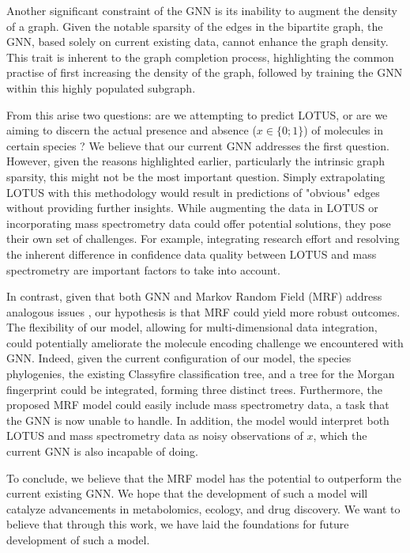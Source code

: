 \documentclass[
11pt, %
oneside, %
english, %
singlespacing, %
headsepline, %
chapterinoneline, %
]{MastersDoctoralThesis} %
\begin{document}
Another significant constraint of the GNN is its inability to augment the density of a graph. Given the notable sparsity of the edges in the bipartite graph, the GNN, based solely on current existing data, cannot enhance the graph density. This trait is inherent to the graph completion process, highlighting the common practise of first increasing the density of the graph, followed by training the GNN within this highly populated subgraph.

From this arise two questions: are we attempting to predict LOTUS, or are we aiming to discern the actual presence and absence ($x \in \{0;1\}$) of molecules in certain species ? We believe that our current GNN addresses the first question. However, given the reasons highlighted earlier, particularly the intrinsic graph sparsity, this might not be the most important question. Simply extrapolating LOTUS with this methodology would result in predictions of "obvious" edges without providing further insights. While augmenting the data in LOTUS or incorporating mass spectrometry data could offer potential solutions, they pose their own set of challenges. For example, integrating research effort and resolving the inherent difference in confidence data quality between LOTUS and mass spectrometry are important factors to take into account.

In contrast, given that both GNN and Markov Random Field (MRF) address analogous issues \cite{jiaGraphBeliefPropagation2021}, our hypothesis is that MRF could yield more robust outcomes. The flexibility of our model, allowing for multi-dimensional data integration, could potentially ameliorate the molecule encoding challenge we encountered with GNN. Indeed, given the current configuration of our model, the species phylogenies, the existing Classyfire classification tree, and a tree for the Morgan fingerprint could be integrated, forming three distinct trees. Furthermore, the proposed MRF model could easily include mass spectrometry data, a task that the GNN is now unable to handle. In addition, the model would interpret both LOTUS and mass spectrometry data as noisy observations of $x$, which the current GNN is also incapable of doing.

To conclude, we believe that the MRF model has the potential to outperform the current existing GNN. We hope that the development of such a model will catalyze advancements in metabolomics, ecology, and drug discovery. We want to believe that through this work, we have laid the foundations for future development of such a model.
\end{document}
